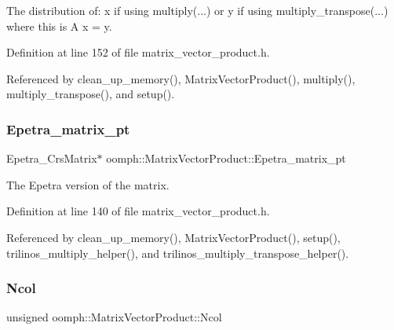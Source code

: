 The distribution of\+: x if using multiply(...) or y if using multiply\+\_\+transpose(...) where this is A x = y. 



Definition at line 152 of file matrix\+\_\+vector\+\_\+product.\+h.



Referenced by clean\+\_\+up\+\_\+memory(), Matrix\+Vector\+Product(), multiply(), multiply\+\_\+transpose(), and setup().

\mbox{\label{classoomph_1_1MatrixVectorProduct_a14264b497811bc0d959be7f3022cd4d2}} 
\subsubsection{\texorpdfstring{Epetra\+\_\+matrix\+\_\+pt}{Epetra\_matrix\_pt}}
{\footnotesize\ttfamily Epetra\+\_\+\+Crs\+Matrix$\ast$ oomph\+::\+Matrix\+Vector\+Product\+::\+Epetra\+\_\+matrix\+\_\+pt\hspace{0.3cm}{\ttfamily [private]}}



The Epetra version of the matrix. 



Definition at line 140 of file matrix\+\_\+vector\+\_\+product.\+h.



Referenced by clean\+\_\+up\+\_\+memory(), Matrix\+Vector\+Product(), setup(), trilinos\+\_\+multiply\+\_\+helper(), and trilinos\+\_\+multiply\+\_\+transpose\+\_\+helper().

\mbox{\label{classoomph_1_1MatrixVectorProduct_ade21a9a8255e6adab4ff367d3716f851}} 
\subsubsection{\texorpdfstring{Ncol}{Ncol}}
{\footnotesize\ttfamily unsigned oomph\+::\+Matrix\+Vector\+Product\+::\+Ncol\hspace{0.3cm}{\ttfamily [private]}}



